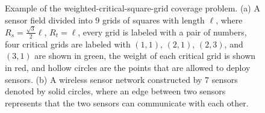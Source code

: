 \begin{figure}
    \centering
    \caption{Example of the
    weighted-critical-square-grid coverage problem. (a) A sensor field
    divided into $9$ grids of squares with length $\ell$, where
    $R_s=\frac{\sqrt{3}}{2}\ell$, $R_t=\ell$, every grid is labeled with
    a pair of numbers, four critical grids are labeled with $(1,1)$,
    $(2,1)$, $(2,3)$, and $(3,1)$ are shown in green, the weight of each
    critical grid is shown in red, and hollow circles are the points
    that are allowed to deploy sensors. (b) A wireless sensor network
    constructed by $7$ sensors denoted by solid circles, where an edge
    between two sensors represents that the two sensors can communicate
    with each other.} \label{1_fig_network_model}
\end{figure}
